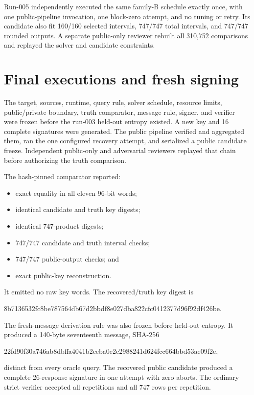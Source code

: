 \documentclass[10pt,a4paper]{article}
\begin{document}
Run-005 independently executed the same family-B schedule exactly once, with
one public-pipeline invocation, one block-zero attempt, and no tuning or retry.
Its candidate also fit 160/160 selected intervals, 747/747 total intervals,
and 747/747 rounded outputs.  A separate public-only reviewer rebuilt all
310,752 comparisons and replayed the solver and candidate constraints.

\section{Final executions and fresh signing}

The target, sources, runtime, query rule, solver schedule, resource limits,
public/private boundary, truth comparator, message rule, signer, and verifier
were frozen before the run-003 held-out entropy existed.  A new key and 16
complete signatures were generated.  The public pipeline verified and
aggregated them, ran the one configured recovery attempt, and serialized a
public candidate freeze.  Independent public-only and adversarial reviewers
replayed that chain before authorizing the truth comparison.

The hash-pinned comparator reported:
\begin{itemize}
  \item exact equality in all eleven 96-bit words;
  \item identical candidate and truth key digests;
  \item identical 747-product digests;
  \item 747/747 candidate and truth interval checks;
  \item 747/747 public-output checks; and
  \item exact public-key reconstruction.
\end{itemize}
It emitted no raw key words.  The recovered/truth key digest is
\begin{center}
\small\ttfamily 8b7136532fc8be787564db67d2bbdf8e027dba822cfc0412377d96f92df426be.
\end{center}

The fresh-message derivation rule was also frozen before held-out entropy.  It
produced a 140-byte seventeenth message, SHA-256
\begin{center}
\small\ttfamily 22fd90f30a746ab8dbffa4041b2ceba0e2c2988241d624fcc664bbd53ae09f2e,
\end{center}
distinct from every oracle query.  The recovered public candidate produced a
complete 26-response signature in one attempt with zero aborts.  The ordinary
strict verifier accepted all repetitions and all 747 rows per repetition.
\end{document}
